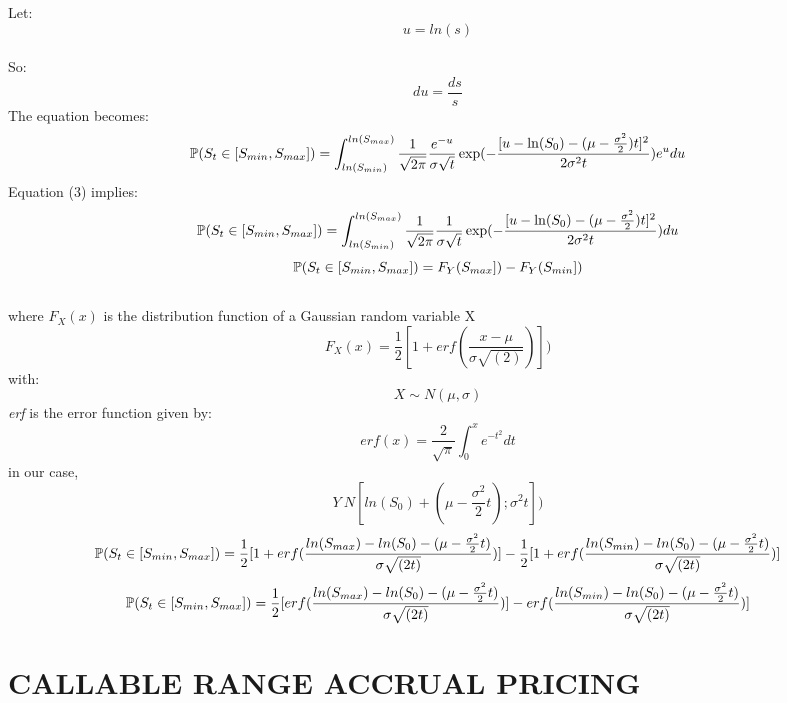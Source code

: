 \documentclass[12pt]{article}
\begin{document}
					Let:  $$u = ln(s)$$\\
					So:  $$du = \frac{ds}{s}$$
					The equation becomes:
					\begin{equation}
					\mathbb{P}(S_t \in [S_{min},S_{max}]) = \int_{ln(S_{min})}^{ln(S_{max})} \frac{1}{\sqrt{2 \pi}} \frac{e^{-u}}{\sigma \sqrt{t}} \exp(-\frac{[u-\ln(S_0)-
						(\mu-\frac{\sigma^2}{2})t]^2}{2 \sigma ^{2}t}) e^{u}du
					\end{equation}
					Equation (3) implies:
					\begin{equation}
					\mathbb{P}(S_t \in [S_{min},S_{max}]) = \int_{ln(S_{min})}^{ln(S_{max})} \frac{1}{\sqrt{2 \pi}} \frac{1}{\sigma \sqrt{t}} \exp(-\frac{[u-\ln(S_0)-
						(\mu-\frac{\sigma^2}{2})t]^2}{2 \sigma ^{2}t}) du
					\end{equation}
					\begin{equation}
					\mathbb{P}(S_t \in [S_{min},S_{max}]) = F_{Y}(S_{max}]) - F_{Y}(S_{min}])
					\end{equation}
					\\
					where $F_{X}(x)$ is the distribution function of a Gaussian random variable X
					\begin{equation}
					F_{X}(x) = \frac{1}{2}[1 + erf(\frac{x - \mu}{\sigma \sqrt{(2)}})])
					\end{equation}
					with:
					 $$X \sim N(\mu,\sigma)$$
					{\it erf} is the error function given by:
					\begin{equation}
					erf(x) = \frac{2}{\sqrt{\pi}} \int_{0}^{x} e^{-t^{2}} dt
					\end{equation}
					in our case,
					\begin{equation}
					 Y~N[ln(S_{0}) + (\mu - \frac{\sigma^{2}}{2}t) ; \sigma^{2}t])
 					\end{equation}
 					\begin{equation}
 					\mathbb{P}(S_t \in [S_{min},S_{max}]) = \frac{1}{2}[1+erf(\frac{ln(S_{max})-ln(S_0)-(\mu-\frac{\sigma^2}{2}t)}{\sigma \sqrt{(2t)}})]-\frac{1}{2}[1+erf(\frac{ln(S_{min})-ln(S_0)-(\mu-\frac{\sigma^2}{2}t)}{\sigma \sqrt{(2t)}})]
 					\end{equation}
 					\begin{equation}
 					\mathbb{P}(S_t \in [S_{min},S_{max}]) = \frac{1}{2}[erf(\frac{ln(S_{max})-ln(S_0)-(\mu-\frac{\sigma^2}{2}t)}{\sigma \sqrt{(2t)}})]-erf(\frac{ln(S_{min})-ln(S_0)-(\mu-\frac{\sigma^2}{2}t)}{\sigma \sqrt{(2t)}})]
 					\end{equation}
	\section{CALLABLE RANGE ACCRUAL PRICING}
\end{document}
